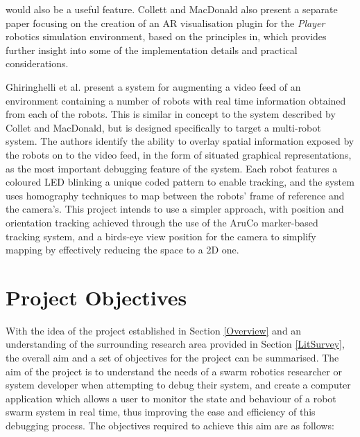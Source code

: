 \documentclass[titlepage,hidelinks,10pt]{article}
\begin{document}
would also be a useful feature. Collett and MacDonald also present a separate paper focusing on the creation of an AR visualisation plugin for the \textit{Player}\cite{Player} robotics simulation environment, based on the principles in\cite{AugmentedRealityDebuggingSystem}, which provides further insight into some of the implementation details and practical considerations\cite{ARForPlayer}.

Ghiringhelli et al. present a system for augmenting a video feed of an environment containing a number of robots with real time information obtained from each of the robots\cite{LEDSwarmAR}. This is similar in concept to the system described by Collet and MacDonald, but is designed specifically to target a multi-robot system. The authors identify the ability to overlay spatial information exposed by the robots on to the video feed, in the form of situated graphical representations, as the most important debugging feature of the system. Each robot features a coloured LED blinking a unique coded pattern to enable tracking, and the system uses homography techniques to map between the robots' frame of reference and the camera's. This project intends to use a simpler approach, with position and orientation tracking achieved through the use of the AruCo marker-based tracking system, and a birds-eye view position for the camera to simplify mapping by effectively reducing the space to a 2D one.

\section{Project Objectives} \label{Objectives}
With the idea of the project established in Section \ref{Overview} and an understanding of the surrounding research area provided in Section \ref{LitSurvey}, the overall aim and a set of objectives for the project can be summarised. The aim of the project is to understand the needs of a swarm robotics researcher or system developer when attempting to debug their system, and create a computer application which allows a user to monitor the state and behaviour of a robot swarm system in real time, thus improving the ease and efficiency of this debugging process. The objectives required to achieve this aim are as follows:
\end{document}
